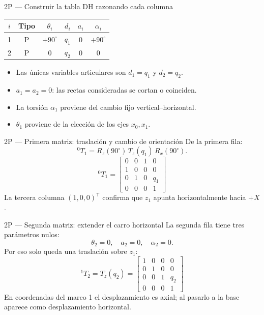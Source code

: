 \documentclass[aspectratio=169,11pt]{beamer}
\begin{document}
\begin{frame}[t]{2P — Construir la tabla DH razonando cada columna}
 \small
 \begin{tabular}{c|c|cccc}
 \toprule
 $i$ & Tipo & $\theta_i$ & $d_i$ & $a_i$ & $\alpha_i$\\\midrule
 1 & P & $+90^\circ$ & $q_1$ & $0$ & $+90^\circ$\\
 2 & P & $0$ & $q_2$ & $0$ & $0$\\
 \bottomrule
 \end{tabular}
 \pause
 \begin{itemize}
  \item Las únicas variables articulares son $d_1=q_1$ y $d_2=q_2$.
  \item $a_1=a_2=0$: las rectas consideradas se cortan o coinciden.
  \item La torsión $\alpha_1$ proviene del cambio fijo vertical--horizontal.
  \item $\theta_1$ proviene de la elección de los ejes $x_0,x_1$.
 \end{itemize}
\end{frame}

\begin{frame}[t]{2P — Primera matriz: traslación y cambio de orientación}
 \small
 De la primera fila:
 \[
 {}^0T_1=R_z(90^\circ)\,T_z(q_1)\,R_x(90^\circ).
 \]
 \pause
 \[
 \boxed{{}^0T_1=
 \begin{bmatrix}
 0&0&1&0\\
 1&0&0&0\\
 0&1&0&q_1\\
 0&0&0&1
 \end{bmatrix}}
 \]
 \small La tercera columna $(1,0,0)^{\mathsf T}$ confirma
 que $z_1$ apunta horizontalmente hacia $+X$.
\end{frame}

\begin{frame}[t]{2P — Segunda matriz: extender el carro horizontal}
 \small
 La segunda fila tiene tres parámetros nulos:
 \[
 \theta_2=0,\quad a_2=0,\quad\alpha_2=0.
 \]
 Por eso solo queda una traslación sobre $z_1$:
 \[
 \boxed{{}^1T_2=T_z(q_2)=
 \begin{bmatrix}
 1&0&0&0\\0&1&0&0\\0&0&1&q_2\\0&0&0&1
 \end{bmatrix}}
 \]
 \pause
 \small En coordenadas del marco 1 el desplazamiento es axial;
 al pasarlo a la base aparece como desplazamiento horizontal.
\end{frame}
\end{document}
